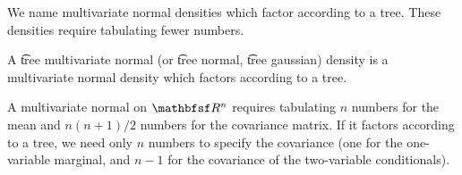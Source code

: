 

We name multivariate normal densities which factor according to a tree.
These densities require tabulating fewer numbers.


A \t{tree multivariate normal} (or \t{tree normal}, \t{tree gaussian}) density is a multivariate normal density which factors according to a tree.


A multivariate normal on $\R^n$ requires tabulating $n$ numbers for the mean and $n(n+1)/2$ numbers for the covariance matrix. If it factors according to a tree, we need only $n$ numbers to specify the covariance (one for the one-variable marginal, and $n-1$ for the covariance of the two-variable conditionals).

\blankpage
